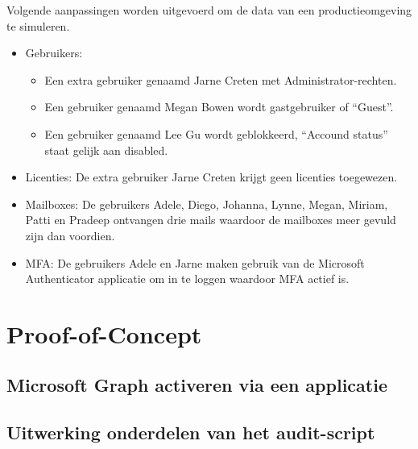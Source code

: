 Volgende aanpassingen worden uitgevoerd om de data van een productieomgeving te simuleren.

\begin{itemize}
    \item Gebruikers: 
    \begin{itemize}
        \item Een extra gebruiker genaamd Jarne Creten met Administrator-rechten.
        \item Een gebruiker genaamd Megan Bowen wordt gastgebruiker of “Guest”.
        \item Een gebruiker genaamd Lee Gu wordt geblokkeerd, “Accound status” staat gelijk aan disabled.
    \end{itemize}
    \item Licenties: De extra gebruiker Jarne Creten krijgt geen licenties toegewezen.
    \item Mailboxes: De gebruikers Adele, Diego, Johanna, Lynne, Megan, Miriam, Patti en Pradeep ontvangen drie mails waardoor de mailboxes meer gevuld zijn dan voordien.
    \item \ac{MFA}: De gebruikers Adele en Jarne maken gebruik van de Microsoft Authenticator applicatie om in te loggen waardoor \ac{MFA} actief is.
\end{itemize}

\section{Proof-of-Concept}

\subsection{Microsoft Graph activeren via een applicatie}

\subsection{Uitwerking onderdelen van het audit-script}


